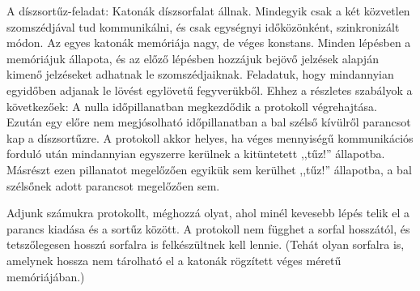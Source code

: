 \begin{Exercise}[counter={sorszam}, difficulty=0]
A díszsortűz-feladat: Katonák díszsorfalat állnak. Mindegyik csak a két közvetlen szomszédjával tud kommunikálni, és csak egységnyi időközönként, szinkronizált módon. Az egyes katonák memóriája nagy, de véges konstans. Minden lépésben a memóriájuk állapota, és az előző lépésben hozzájuk bejövő jelzések alapján kimenő jelzéseket adhatnak le szomszédjaiknak. Feladatuk, hogy mindannyian egyidőben adjanak le lövést egylövetű fegyverükből. Ehhez a részletes szabályok a következőek: A nulla időpillanatban megkezdődik a protokoll végrehajtása. Ezután egy előre nem megjósolható időpillanatban a bal szélső kívülről parancsot kap a díszsortűzre. A protokoll akkor helyes, ha véges mennyiségű kommunikációs forduló után mindannyian egyszerre kerülnek a kitüntetett ,,tűz!'' állapotba. Másrészt ezen pillanatot megelőzően egyikük sem kerülhet ,,tűz!'' állapotba, a bal szélsőnek adott parancsot megelőzően sem.

Adjunk számukra protokollt, méghozzá olyat, ahol minél kevesebb lépés telik el a parancs kiadása és a sortűz között. A protokoll nem függhet a sorfal hosszától, és tetszőlegesen hosszú sorfalra is felkészültnek kell lennie. (Tehát olyan sorfalra is, amelynek hossza nem tárolható el a katonák rögzített véges méretű memóriájában.)

\end{Exercise}


